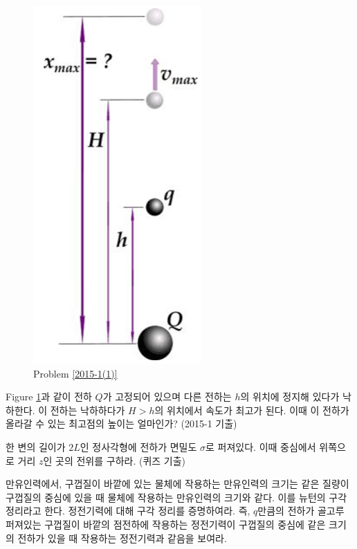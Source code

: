 \begin{problem}\label{2015-1(1)}
\begin{figure}[h]
\centering\includegraphics[scale=0.5]{Pictures/2015-1(1).PNG}
\caption{Problem \ref{2015-1(1)}}
\label{fig:2015-1(1)}
\end{figure}
Figure \ref{fig:2015-1(1)}과 같이 전하 $Q$가 고정되어 있으며 다른 전하는 $h$의 위치에 정지해 있다가 낙하한다. 이 전하는 낙하하다가 $H>h$의 위치에서 속도가 최고가 된다. 이때 이 전하가 올라갈 수 있는 최고점의 높이는 얼마인가? (2015-1 기출)
\end{problem}

\begin{problem}
한 변의 길이가 $2L$인 정사각형에 전하가 면밀도 $\sigma$로 퍼져있다. 이때 중심에서 위쪽으로 거리 $z$인 곳의 전위를 구하라. (퀴즈 기출)
\end{problem}

\begin{problem}
만유인력에서, 구껍질이 바깥에 있는 물체에 작용하는 만유인력의 크기는 같은 질량이 구껍질의 중심에 있을 때 물체에 작용하는 만유인력의 크기와 같다. 이를 뉴턴의 구각정리라고 한다. 정전기력에 대해 구각 정리를 증명하여라. 즉, $q$만큼의 전하가 골고루 퍼져있는 구껍질이 바깥의 점전하에 작용하는 정전기력이 구껍질의 중심에 같은 크기의 전하가 있을 때 작용하는 정전기력과 같음을 보여라.
\end{problem}

